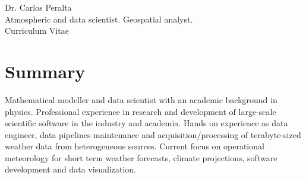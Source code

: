 \documentclass[10pt]{article} %
\begin{document}
\begin{paracol}{2} %


\parbox[top][0.12\textheight][c]{\linewidth}{ %
	\vspace{-0.04\textheight} %
	\centering %
	{\sffamily\Huge Dr. Carlos Peralta}\\\medskip %
	{\sffamily Atmospheric and data scientist. Geospatial analyst.}\\\medskip %
	{\Huge\color{headings}\cvtextfont Curriculum Vitae}
}


\section{Summary}
Mathematical modeller and data scientist with an academic background in physics. 
Professional experience in research and development of large-scale scientific software in the industry and academia. 
Hands on experience as data engineer, data pipelines maintenance and acquisition/processing of terabyte-sized weather data from heterogeneous sources.
Current focus on operational meteorology for short term weather forecasts, climate projections, software development and data visualization.



\end{paracol}
\end{document}
